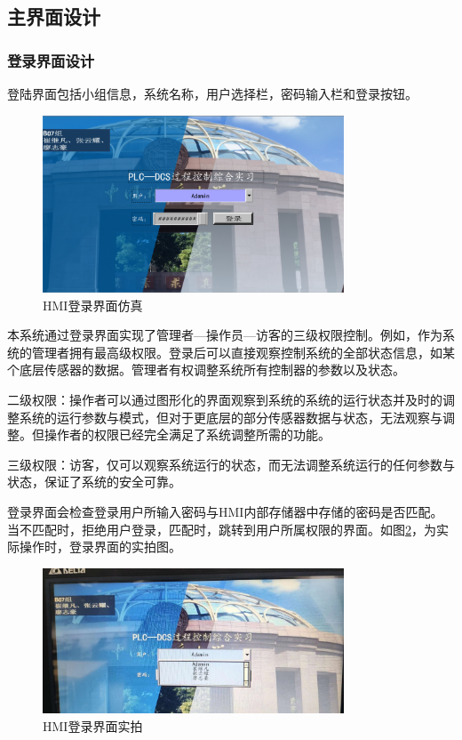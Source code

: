 \documentclass[UTF8]{article}
\begin{document}
\subsection{主界面设计}
\subsubsection{登录界面设计}
登陆界面包括小组信息，系统名称，用户选择栏，密码输入栏和登录按钮。
\begin{figure}[H]
    \centering %
    \includegraphics[width=0.8\textwidth]{figure/HMI登录界面仿真.png} 
    \caption{HMI登录界面仿真} %
    \label{fig:img4} %
\end{figure}

本系统通过登录界面实现了管理者—操作员—访客的三级权限控制。例如，作为系统的管理者拥有最高级权限。登录后可以直接观察控制系统的全部状态信息，如某个底层传感器的数据。管理者有权调整系统所有控制器的参数以及状态。

二级权限：操作者可以通过图形化的界面观察到系统的系统的运行状态并及时的调整系统的运行参数与模式，但对于更底层的部分传感器数据与状态，无法观察与调整。但操作者的权限已经完全满足了系统调整所需的功能。

三级权限：访客，仅可以观察系统运行的状态，而无法调整系统运行的任何参数与状态，保证了系统的安全可靠。

登录界面会检查登录用户所输入密码与HMI内部存储器中存储的密码是否匹配。当不匹配时，拒绝用户登录，匹配时，跳转到用户所属权限的界面。如图\ref{fig:img5}，为实际操作时，登录界面的实拍图。
\begin{figure}[H]
    \centering %
    \includegraphics[width=0.8\textwidth]{figure/HMI登录界面实拍.png} 
    \caption{HMI登录界面实拍} %
    \label{fig:img5} %
\end{figure}
\end{document}
